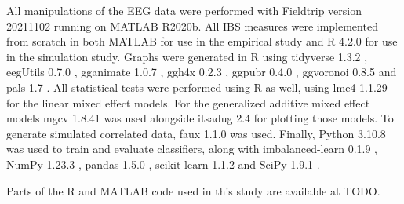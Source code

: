 All manipulations of the EEG data were performed with Fieldtrip version
20211102 \parencite{oostenveld_fieldtrip_2011} running on MATLAB R2020b. All
IBS measures were implemented from scratch in both MATLAB for use in the
empirical study and R 4.2.0 \parencite{r_core_team_r_2022} for use in the
simulation study. Graphs were generated in R using tidyverse 1.3.2
\parencite{wickham_welcome_2019}, eegUtils 0.7.0
\parencite{craddock_eegutils_2022}, gganimate 1.0.7
\parencite{pedersen_gganimate_2020}, ggh4x 0.2.3
\parencite{van_den_brand_ggh4x_2022}, ggpubr 0.4.0
\parencite{kassambara_ggpubr_2020}, ggvoronoi 0.8.5
\parencite{garrett_ggvoronoi_2022} and pals 1.7 \parencite{wright_pals_2021}.
All statistical tests were performed using R as well, using lme4 1.1.29
\parencite{bates_fitting_2015} for the linear mixed effect models. For the
generalized additive mixed effect models mgcv 1.8.41
\parencite{wood_generalized_2006} was used alongside itsadug 2.4
\parencite{van_rij_itsadug_2020} for plotting those models. To generate
simulated correlated data, faux 1.1.0 \parencite{debruine_faux_2021} was used.
Finally, Python 3.10.8 \parencite{python_software_foundation_python_2021} was
used to train and evaluate classifiers, along with imbalanced-learn 0.1.9
\parencite{lemaitre_imbalanced-learn_2017}, NumPy 1.23.3
\parencite{harris_array_2020}, pandas 1.5.0 \parencite{mckinney_data_2010},
scikit-learn 1.1.2 \parencite{pedregosa_scikit-learn_2011} and SciPy 1.9.1
\parencite{virtanen_scipy_2020}.

Parts of the R and MATLAB code used in this study are available at TODO.
